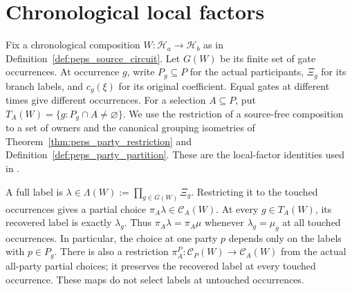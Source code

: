 \section{Chronological local factors}
\label{sec:peps_chronological_network}

Fix a chronological composition $W:\mathcal H_a\to\mathcal H_b$ as in
Definition~\ref{def:peps_source_circuit}. Let $G(W)$ be its finite set of gate
occurrences. At occurrence $g$, write $P_g\subseteq P$ for the actual
participants, $\Xi_g$ for its branch labels, and $c_g(\xi)$ for its original
coefficient. Equal gates at different times give different occurrences.
For a selection $A\subseteq P$, put
$T_A(W)=\{g:P_g\cap A\ne\varnothing\}$.
We use the restriction of a source-free composition to a set of owners and
the canonical grouping isometries of
Theorem~\ref{thm:peps_party_restriction} and
Definition~\ref{def:peps_party_partition}.
These are the local-factor identities used in
\cite[proof of Theorem~5.2]{OpenAI2026PolynomialPEPS}.


\begin{definition}
    \label{def:peps_chrono_full_labels}
    \leanok
    A full label is $\lambda\in\Lambda(W):=\prod_{g\in G(W)}\Xi_g$.
    Restricting it to the touched occurrences gives a partial choice
    $\pi_A\lambda\in\mathcal C_A(W)$. At every $g\in T_A(W)$, its recovered
    label is exactly $\lambda_g$. Thus $\pi_A\lambda=\pi_A\mu$ whenever
    $\lambda_g=\mu_g$ at all touched occurrences. In particular, the choice at
    one party $p$ depends only on the labels with $p\in P_g$.
    There is also a restriction $\pi_A^P:\mathcal C_P(W)\to\mathcal C_A(W)$
    from the actual all-party partial choices; it preserves the recovered label
    at every touched occurrence. These maps do not select labels at untouched
    occurrences.
\end{definition}

